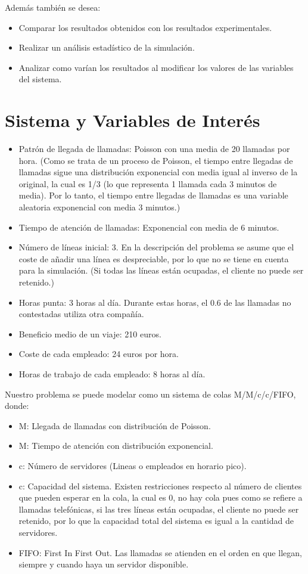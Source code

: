 \documentclass{article}
\begin{document}
Además también se desea:
\begin{itemize}
    \item Comparar los resultados obtenidos con los resultados experimentales.
    \item Realizar un análisis estadístico de la simulación.
    \item Analizar como varían los resultados al modificar los valores de las variables del sistema.
\end{itemize}

\section{Sistema y Variables de Interés}
\begin{itemize}
    \item Patrón de llegada de llamadas: Poisson con una media de 20 llamadas por hora. (Como se trata de un proceso de Poisson, el tiempo entre llegadas de llamadas sigue una distribución exponencial con media igual al inverso de la original, la cual es 1/3 (lo que representa 1 llamada cada 3 minutos de media). Por lo tanto, el tiempo entre llegadas de llamadas es una variable aleatoria exponencial con media 3 minutos.)
    \item Tiempo de atención de llamadas: Exponencial con media de 6 minutos.
    \item Número de líneas inicial: 3. En la descripción del problema se asume que el coste de añadir una línea es despreciable, por lo que no se tiene en cuenta para la simulación. (Si todas las líneas están ocupadas, el cliente no puede ser retenido.)
    \item Horas punta: 3 horas al día. Durante estas horas, el 0.6 de las llamadas no contestadas utiliza otra compañía.
    \item Beneficio medio de un viaje: 210 euros.
    \item Coste de cada empleado: 24 euros por hora.
    \item Horas de trabajo de cada empleado: 8 horas al día.
\end{itemize}

Nuestro problema se puede modelar como un sistema de colas M/M/c/c/FIFO, donde:

\begin{itemize}
    \item M: Llegada de llamadas con distribución de Poisson.
    \item M: Tiempo de atención con distribución exponencial.
    \item c: Número de servidores (Lineas o empleados en horario pico).
    \item c: Capacidad del sistema. Existen restricciones respecto al número de clientes que pueden esperar en la cola, la cual es 0, no hay cola pues como se refiere a llamadas telefónicas, si las tres líneas están ocupadas, el cliente no puede ser retenido, por lo que la capacidad total del sistema es igual a la cantidad de servidores.
    \item FIFO: First In First Out. Las llamadas se atienden en el orden en que llegan, siempre y cuando haya un servidor disponible.
\end{itemize}
\end{document}
